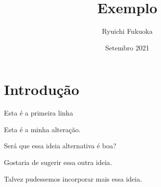 \documentclass{article}
\title{Exemplo}
\author{Ryuichi Fukuoka}
\date{Setembro 2021}
\begin{document}
\maketitle

\section{Introdução}

\indent

Esta é a primeira linha

Esta é a minha alteração.

Será que essa ideia alternativa é boa?

Gostaria de sugerir essa outra ideia.

Talvez pudessemos incorporar mais essa ideia.
\end{document}
